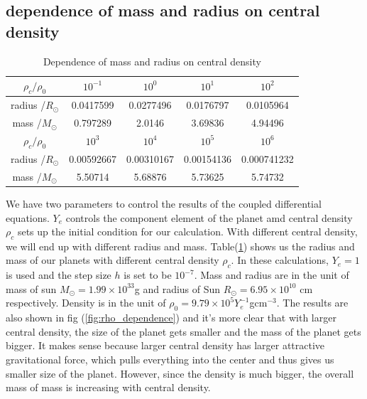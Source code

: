 \documentclass{article}
\begin{document}
\subsection{dependence of mass and radius on central density}
\begin{table}[H]
\centering
\begin{tabular}{|c|c|c|c|c|}
\hline
$\rho_c /\rho_0$& $10^{-1}$& $10^{0}$ & $10^{1}$  & $10^{2}$  \\
\hline
radius /$R_{\odot}$& 0.0417599&  0.0277496&   0.0176797&  0.0105964\\
\hline
mass /$M_{\odot}$& 0.797289&  2.0146&  3.69836&  4.94496\\
\hline
$\rho_c /\rho_0$&  $10^{3}$  & $10^{4}$  & $10^{5}$  & $10^{6}$ \\
\hline
radius /$R_{\odot}$& 0.00592667& 0.00310167& 0.00154136 & 0.000741232\\
\hline
mass /$M_{\odot}$&5.50714&  5.68876&  5.73625 &  5.74732\\
\hline
\end{tabular}
\caption{Dependence of mass and radius on central density}
\label{tab:rho_dependence}
\end{table}
We have two parameters to control the results of the coupled differential equations. $Y_e$ controls the component element of the planet amd central density $\rho_c$ sets up the initial condition for our calculation. With different central density, we will end up with different radius and mass. Table(\ref{tab:rho_dependence}) shows us the radius and mass of our planets with different central density $\rho_c$. In these calculations, $Y_e=1$ is used and the step size $h$ is set to be $10^{-7}$. Mass and radius are in the unit of mass of sun $M_{\odot}= 1.99\times 10^{33}$g and radius of Sun $R_{\odot}=6.95 \times 10^{10}$ cm respectively.  Density is in the unit of $\rho_{0}=9.79 \times 10^5 Y_e^{-1}$gcm$^{-3}$. The results are also shown in fig (\ref{fig:rho_dependence}) and it's more clear that with larger central density, the size of the planet gets smaller and the mass of the planet gets bigger. It makes sense because larger central density has larger attractive gravitational force, which pulls everything into the center and thus gives us smaller size of the planet. However, since the density is much bigger, the overall mass of mass is increasing with central density.
\end{document}
